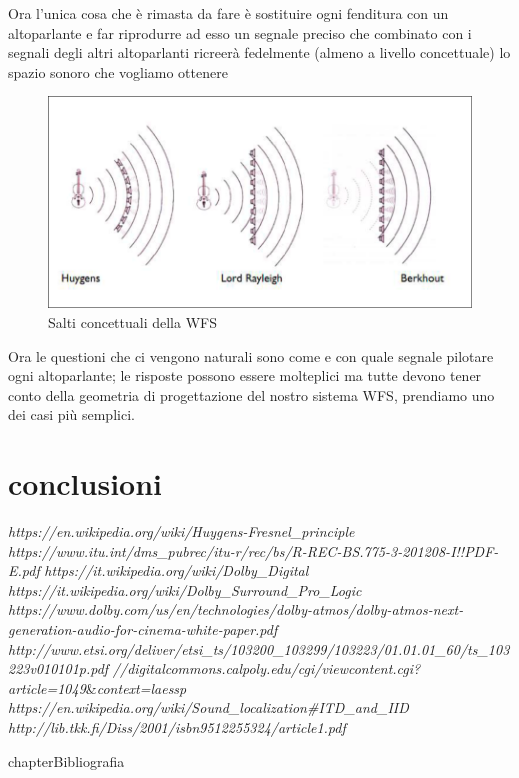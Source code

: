 \documentclass[12pt,a4paper]{report}
\begin{document}
Ora l'unica cosa che è rimasta da fare è sostituire ogni fenditura con un altoparlante e far riprodurre ad esso un  segnale preciso che combinato con i segnali degli altri altoparlanti ricreerà fedelmente (almeno a livello concettuale) lo spazio sonoro che vogliamo ottenere

\begin{figure}[htbp]
	\centering
	\includegraphics[scale=0.55]{figures/wfs.png}
	\caption {Salti concettuali della WFS} 
	\label{fig:wfs}
	\end{figure}
	

Ora le questioni che ci vengono naturali sono come e con quale segnale pilotare ogni altoparlante; le risposte possono essere molteplici ma tutte devono tener conto della geometria di progettazione del nostro sistema WFS, prendiamo uno dei casi più semplici.\\


\chapter*{conclusioni}



\begin{thebibliography}{}

 \textit{https://en.wikipedia.org/wiki/Huygens-Fresnel\_principle}
 \textit{https://www.itu.int/dms\_pubrec/itu-r/rec/bs/R-REC-BS.775-3-201208-I!!PDF-E.pdf}
 \textit{https://it.wikipedia.org/wiki/Dolby\_Digital}
 \textit{https://it.wikipedia.org/wiki/Dolby\_Surround\_Pro\_Logic}
 \textit{https://www.dolby.com/us/en/technologies/dolby-atmos/dolby-atmos-next-generation-audio-for-cinema-white-paper.pdf}
\textit{http://www.etsi.org/deliver/etsi\_ts/103200\_103299/103223/01.01.01\_60/ts\_103223v010101p.pdf}
\textit{//digitalcommons.calpoly.edu/cgi/viewcontent.cgi?article=1049}\&\textit{context=laessp}
 \textit{https://en.wikipedia.org/wiki/Sound\_localization\#ITD\_and\_IID}
 \textit{http://lib.tkk.fi/Diss/2001/isbn9512255324/article1.pdf}
\end{thebibliography}
 {chapter}{Bibliografia}
\end{document}
